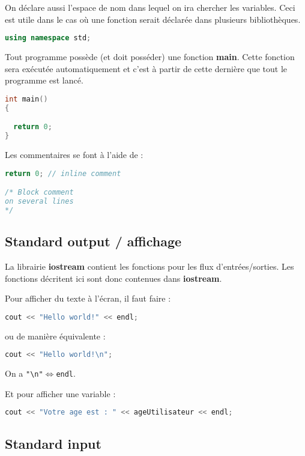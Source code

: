 \documentclass[a4paper,twoside]{article}
\begin{document}
\bigskip

On déclare aussi l'espace de nom dans lequel on ira chercher les variables. Ceci est utile dans le cas où une fonction serait 
déclarée dans plusieurs bibliothèques. 
\begin{lstlisting}[language=C++]
using namespace std;
\end{lstlisting}

\bigskip

Tout programme possède (et doit posséder) une fonction \textbf{main}. Cette fonction sera exécutée automatiquement et c'est à 
partir de cette dernière que tout le programme est lancé. 
\begin{lstlisting}[language=C++]
int main()
{

  return 0;
}

\end{lstlisting}

Les commentaires se font à l'aide de :
\begin{lstlisting}[language=C++]
return 0; // inline comment

/* Block comment
on several lines
*/
\end{lstlisting}


\subsection{Standard output / affichage}
La librairie \textbf{iostream} contient les fonctions pour les flux d'entrées/sorties. Les fonctions décritent ici sont donc 
contenues dans \textbf{iostream}.

Pour afficher du texte à l'écran, il faut faire :
\begin{lstlisting}[language=C++]
cout << "Hello world!" << endl;
\end{lstlisting}
ou de manière équivalente :
\begin{lstlisting}[language=C++]
cout << "Hello world!\n";
\end{lstlisting}

On a \verb|"\n"|$\Leftrightarrow$\verb|endl|. 

Et pour afficher une variable :
\begin{lstlisting}[language=C++]
cout << "Votre age est : " << ageUtilisateur << endl;
\end{lstlisting}

\subsection{Standard input}
\end{document}
